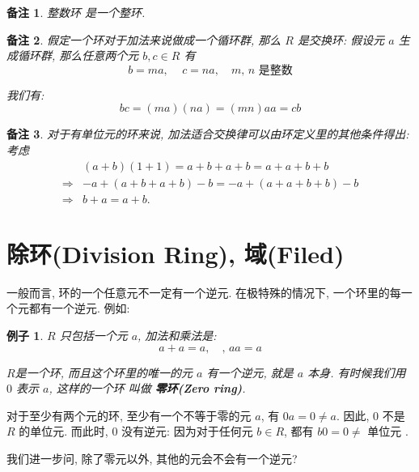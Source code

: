 \documentclass[utf8]{ctexbook}
\newtheorem{memo}{备注}[section]
\newtheorem{example}{例子}[section]
\begin{document}
\begin{memo}
整数环 是一个整环. 
\end{memo}

\begin{memo}
假定一个环对于加法来说做成一个循环群, 那么 $R$ 是交换环: 假设元 $a$ 生成循环群, 那么任意两个元 $b, c \in R$ 有
\begin{equation}
b = ma, \quad \, c = n a, \quad m, \, n \mbox{ 是整数}
\end{equation}  

我们有:
\begin{equation}
bc = (ma ) (na) = (mn) a a = c b
\end{equation}

\end{memo}


\begin{memo}
对于有单位元的环来说, 加法适合交换律可以由环定义里的其他条件得出: 考虑
\begin{align*}
 & (a+b) (1+1) = a+b+a+b = a+a+b+b  \\
 \Rightarrow & -a + (a+b+a+b) - b = -a + (a+a+b+b ) -b \\
 \Rightarrow & b+a = a + b   .
\end{align*}

\end{memo}

\section{除环(Division Ring), 域(Filed)}

一般而言, 环的一个任意元不一定有一个逆元. 在极特殊的情况下, 一个环里的每一个元都有一个逆元. 例如:

\begin{example}
$R$ 只包括一个元 $a$, 加法和乘法是:
\begin{equation}
a + a = a, \quad, \, a a = a
\end{equation}

$R$是一个环, 而且这个环里的唯一的元 $a$ 有一个逆元, 就是 $a$ 本身. 有时候我们用 $0$ 表示 $a$, 这样的一个环 叫做 \textbf{零环(Zero ring)}.

\end{example}


对于至少有两个元的环, 至少有一个不等于零的元 $a$, 有 $0 a = 0 \neq a$. 因此, $0$ 不是 $R$ 的单位元. 而此时, $0$ 没有逆元: 因为对于任何元 $b \in R$, 都有 $b0 =  0 \neq \mbox{ 单位元 }$.

我们进一步问, 除了零元以外, 其他的元会不会有一个逆元? 
\end{document}
